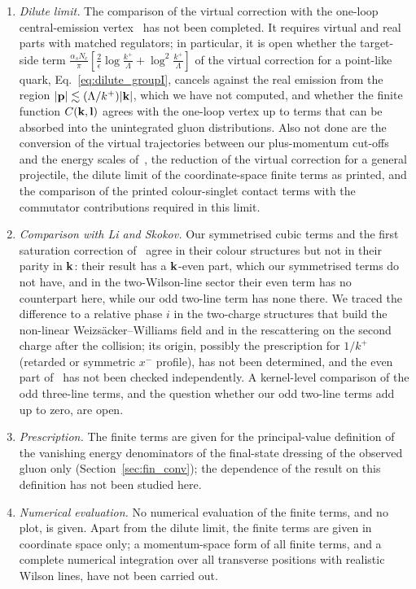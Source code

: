 \begin{enumerate}
\item[(i)] \emph{Dilute limit.} The comparison of the virtual correction with the one-loop central-emission vertex~\cite{Fadin:1998py,DelDuca:1998cx,Bartels:2006hg} has not been completed. It requires virtual and real parts with matched regulators; in particular, it is open whether the target-side term $\frac{\alpha_sN_c}{\pi}[\frac2\epsilon\log\frac{k^+}{\Lambda}+\log^2\frac{k^+}{\Lambda}]$ of the virtual correction for a point-like quark, Eq.~\eqref{eq:dilute_groupI}, cancels against the real emission from the region $|\mathbf{p}|\lesssim(\Lambda/k^+)|\mathbf{k}|$, which we have not computed, and whether the finite function $C(\mathbf{k},\mathbf{l})$ agrees with the one-loop vertex up to terms that can be absorbed into the unintegrated gluon distributions. Also not done are the conversion of the virtual trajectories between our plus-momentum cut-offs and the energy scales of~\cite{Bartels:2006hg}, the reduction of the virtual correction for a general projectile, the dilute limit of the coordinate-space finite terms as printed, and the comparison of the printed colour-singlet contact terms with the commutator contributions required in this limit.
\item[(ii)] \emph{Comparison with Li and Skokov.} Our symmetrised cubic terms and the first saturation correction of~\cite{Li:2021ntm} agree in their colour structures but not in their parity in $\mathbf{k}$: their result has a $\mathbf{k}$-even part, which our symmetrised terms do not have, and in the two-Wilson-line sector their even term has no counterpart here, while our odd two-line term has none there. We traced the difference to a relative phase $i$ in the two-charge structures that build the non-linear Weizs\"acker--Williams field and in the rescattering on the second charge after the collision; its origin, possibly the prescription for $1/k^+$ (retarded or symmetric $x^-$ profile), has not been determined, and the even part of~\cite{Li:2021ntm} has not been checked independently. A kernel-level comparison of the odd three-line terms, and the question whether our odd two-line terms add up to zero, are open.
\item[(iii)] \emph{Prescription.} The finite terms are given for the principal-value definition of the vanishing energy denominators of the final-state dressing of the observed gluon only (Section~\ref{sec:fin_conv}); the dependence of the result on this definition has not been studied here.
\item[(iv)] \emph{Numerical evaluation.} No numerical evaluation of the finite terms, and no plot, is given. Apart from the dilute limit, the finite terms are given in coordinate space only; a momentum-space form of all finite terms, and a complete numerical integration over all transverse positions with realistic Wilson lines, have not been carried out.

\end{enumerate}

